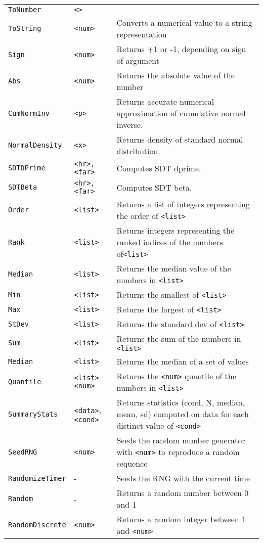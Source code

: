 \begin{longtable}{p{3cm}p{3cm}p{6cm}}
\verb+ToNumber+ &\verb+<>+ & \\ 
\verb+ToString+ &\verb+<num>+ &Converts a numerical value to a string representation\\ 
\verb+Sign+ &\verb+<num>+ &Returns +1 or -1, depending on sign of argument\\ 
\verb+Abs+ &\verb+<num>+ &Returns the absolute value of the number\\ 
\verb+CumNormInv+&\verb+<p>+&Returns accurate numerical approximation of cumulative normal inverse.\\
\verb+NormalDensity+&\verb+<x>+&Returns density of standard normal distribution.\\
\verb+SDTDPrime+&\verb+<hr>,<far>+&Computes SDT dprime.\\
\verb+SDTBeta+&\verb+<hr>,<far>+&Computes SDT beta.\\
\verb+Order+ &\verb+<list>+ &Returns a list of integers representing the order of \verb+<list>+\\ 
\verb+Rank+ &\verb+<list>+ &Returns integers representing the ranked indices of the numbers of\verb+<list>+\\ 
\verb+Median+ &\verb+<list>+ &Returns the median value of the numbers in \verb+<list>+\\ 
\verb+Min+ &\verb+<list>+ &Returns the smallest of \verb+<list>+\\ 
\verb+Max+ &\verb+<list>+ &Returns the largest of \verb+<list>+\\ 
\verb+StDev+ &\verb+<list>+ &Returns the standard dev of \verb+<list>+ \\ 
\verb+Sum+ &\verb+<list>+ &Returns the sum of the numbers in \verb+<list>+\\ 
\verb+Median+ &\verb+<list>+ &Returns the median of a set of values \\ 
\verb+Quantile+ &\verb+<list> <num>+ &Returns the \verb+<num>+ quantile of the numbers in \verb+<list>+\\ 
\verb+SummaryStats+ &\verb+<data>+,\verb+<cond>+ &Returns statistics (cond, N, median, mean, sd) computed on data for each distinct value of \verb+<cond>+\\ 
\verb+SeedRNG+ &\verb+<num>+ &Seeds the random number generator with \verb+<num>+ to reproduce a random sequence\\ 
\verb+RandomizeTimer+ & - & Seeds the RNG with the current time\\ 
\verb+Random+ & - & Returns a random number between 0 and 1\\ 
\verb+RandomDiscrete+ &\verb+<num>+ &Returns a random integer between 1 and \verb+<num>+ \\ 

\end{longtable}
